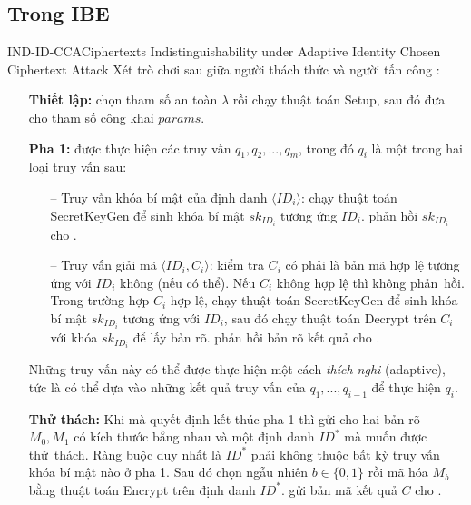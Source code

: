 \documentclass[class=report, crop=false]{standalone}
\begin{document}
		\subsection{Trong IBE}
			\begin{game}{IND-ID-CCA}{Ciphertexts Indistinguishability under Adaptive Identity Chosen Ciphertext Attack}
				Xét trò chơi sau giữa người thách thức \challenger và người tấn công \adversary:
				\vspace{-1.8\baselineskip}
				\begin{itemize}[leftmargin=1.5cm, itemindent=-0.5cm]
					\item[] \textbf{Thiết lập:} \challenger chọn tham số an toàn $\lambda$ rồi chạy thuật toán \textsf{Setup}, sau đó đưa cho \adversary tham số công khai $params$.
					\item[] \textbf{Pha 1:} \adversary được thực hiện các truy vấn $q_1, q_2, ..., q_m$, trong đó $q_i$ là một trong hai loại truy vấn sau:
					\begin{itemize}
						\item[--] Truy vấn khóa bí mật của định danh $\langle ID_i \rangle$: \challenger chạy thuật toán \textsf{SecretKeyGen} để sinh khóa bí mật $sk_{ID_i}$ tương ứng $ID_i$. \challenger phản hồi $sk_{ID_i}$ cho \adversary .
						\item[--] Truy vấn giải mã $\langle ID_i, C_i \rangle$: \challenger kiểm tra $C_i$ có phải là bản mã hợp lệ tương ứng với $ID_i$ không (nếu có thể). Nếu $C_i$ không hợp lệ thì \challenger không phản~hồi. Trong trường hợp $C_i$ hợp lệ, \challenger chạy thuật toán \textsf{SecretKeyGen} để sinh khóa bí mật $sk_{ID_i}$ tương ứng với $ID_i$, sau đó chạy thuật toán \textsf{Decrypt} trên $C_i$ với khóa $sk_{ID_i}$ để lấy bản rõ. \challenger phản hồi bản rõ kết quả cho \adversary .
					\end{itemize}
					Những truy vấn này có thể được thực hiện một cách \emph{thích nghi} (adaptive), tức là \adversary có thể dựa vào những kết quả truy vấn của $q_1, ..., q_{i - 1}$ để thực hiện $q_i$.
					\item[] \textbf{Thử thách:} Khi mà \adversary quyết định kết thúc pha 1 thì \adversary gửi cho \challenger hai bản rõ $M_0, M_1$ có kích thước bằng nhau và một định danh $ID^*$ mà \adversary muốn được thử~thách. Ràng buộc duy nhất là $ID^*$ phải không thuộc bất kỳ truy vấn khóa bí mật nào ở pha 1. Sau đó \challenger chọn ngẫu nhiên $b \in \{0, 1\}$ rồi mã hóa $M_b$ bằng thuật toán \textsf{Encrypt} trên định danh $ID^*$. \challenger gửi bản mã kết quả $C$ cho \adversary.

\end{itemize}
\end{game}
\end{document}
